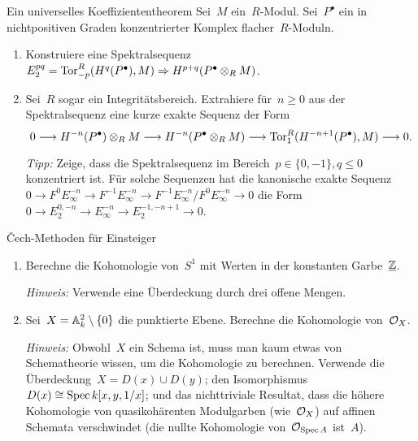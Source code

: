 \documentclass{uebblatt}
\begin{document}

\begin{aufgabe}{Ein universelles Koeffiziententheorem}
Sei~$M$ ein~$R$-Modul. Sei~$P^\bullet$ ein in nichtpositiven Graden
konzentrierter Komplex flacher~$R$-Moduln.
\begin{enumerate}
\item Konstruiere eine Spektralsequenz $E_2^{pq} =
\Tor_{-p}^R(H^q(P^\bullet),M) \Rightarrow H^{p+q}(P^\bullet \otimes_R M)$.
\item Sei~$R$ sogar ein Integritätsbereich. Extrahiere für~$n \geq 0$ aus der
Spektralsequenz eine kurze exakte Sequenz der Form
\[ 0 \lra H^{-n}(P^\bullet) \otimes_R M \lra H^{-n}(P^\bullet \otimes_R M)
  \lra \Tor_1^R(H^{-n+1}(P^\bullet), M) \lra 0. \]
{\tiny\emph{Tipp:} Zeige, dass die Spektralsequenz im Bereich~$p \in \{ 0,-1
\}, q \leq 0$ konzentriert ist. Für solche Sequenzen hat die
kanonische exakte Sequenz $0 \to F^0 E_\infty^{-n} \to F^{-1}
E_\infty^{-n} \to F^{-1} E_\infty^{-n} / F^0 E_\infty^{-n} \to 0$ die Form
$0 \to E_2^{0,-n} \to E_\infty^{-n} \to E_2^{-1,-n+1} \to 0$.\par}
\end{enumerate}
\end{aufgabe}

\begin{aufgabe}{Čech-Methoden für Einsteiger}
\begin{enumerate}
\item Berechne die Kohomologie von~$S^1$ mit Werten in der konstanten Garbe~$\ul{\ZZ}$.

{\tiny\emph{Hinweis:} Verwende eine Überdeckung durch drei offene Mengen.\par}

\item Sei~$X = \AA^2_k \setminus \{0\}$ die punktierte Ebene.
Berechne die Kohomologie von~$\O_X$.

{\tiny\emph{Hinweis:} Obwohl~$X$ ein Schema ist, muss man kaum etwas von
Schematheorie wissen, um die Kohomologie zu berechnen. Verwende die
Überdeckung~$X = D(x) \cup D(y)$; den Isomorphismus~$D(x) \cong \Spec
k[x,y,1/x]$; und das nichttriviale Resultat, dass die höhere Kohomologie von
quasikohärenten Modulgarben (wie~$\O_X$) auf affinen Schemata
verschwindet (die nullte Kohomologie von~$\O_{\Spec A}$ ist~$A$).\par}
\end{enumerate}
\end{aufgabe}
\end{document}
